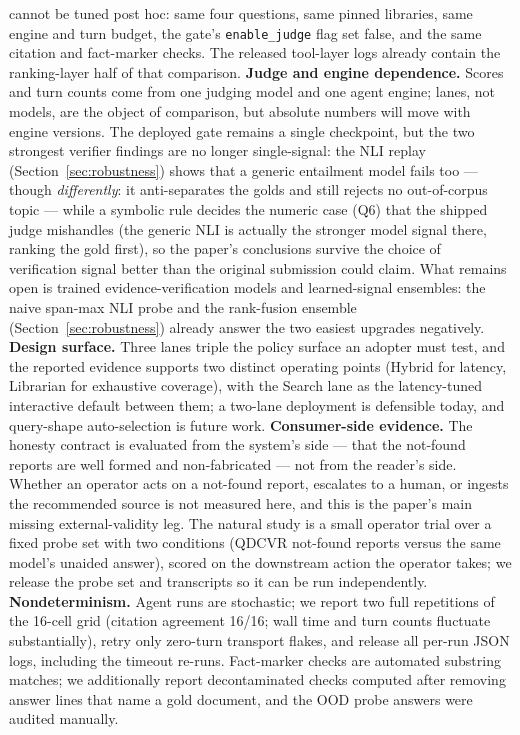 cannot be tuned post hoc: same four questions, same pinned libraries, same
engine and turn budget, the gate's \texttt{enable\_judge} flag set false, and
the same citation and fact-marker checks. The released tool-layer logs already
contain the ranking-layer half of that comparison.
\textbf{Judge and engine dependence.} Scores and turn counts come from one
judging model and one agent engine; lanes, not models, are the object of
comparison, but absolute numbers will move with engine versions. The
deployed gate remains a single checkpoint, but the two strongest
verifier findings are no longer single-signal: the NLI replay
(Section~\ref{sec:robustness}) shows that a generic entailment model
fails too --- though \emph{differently}: it anti-separates the golds and
still rejects no out-of-corpus topic --- while a symbolic rule decides
the numeric case (Q6) that the shipped judge mishandles (the generic NLI
is actually the stronger model signal there, ranking the gold first), so
the paper's conclusions survive the choice of verification
signal better than the original submission could claim. What remains
open is trained evidence-verification models and learned-signal
ensembles: the naive span-max NLI probe and the rank-fusion ensemble
(Section~\ref{sec:robustness}) already answer the two easiest upgrades
negatively.
\textbf{Design surface.} Three lanes triple the policy surface an adopter
must test, and the reported evidence supports two distinct operating
points (Hybrid for latency, Librarian for exhaustive coverage), with the
Search lane as the latency-tuned interactive default between them; a
two-lane deployment is defensible today, and query-shape auto-selection is
future work.
\textbf{Consumer-side evidence.} The honesty contract is evaluated from the
system's side --- that the not-found reports are well formed and
non-fabricated --- not from the reader's side. Whether an operator acts on a
not-found report, escalates to a human, or ingests the recommended source is
not measured here, and this is the paper's main missing external-validity leg.
The natural study is a small operator trial over a fixed probe set with two
conditions (QDCVR not-found reports versus the same model's unaided answer),
scored on the downstream action the operator takes; we release the probe set
and transcripts so it can be run independently.
\textbf{Nondeterminism.} Agent runs are stochastic; we report two full
repetitions of the 16-cell grid (citation agreement 16/16; wall time and
turn counts fluctuate substantially), retry only zero-turn transport
flakes, and release all per-run JSON logs, including the timeout re-runs.
Fact-marker checks are automated substring matches; we additionally report
decontaminated checks computed after removing answer lines that name a
gold document, and the OOD probe answers were audited manually.

